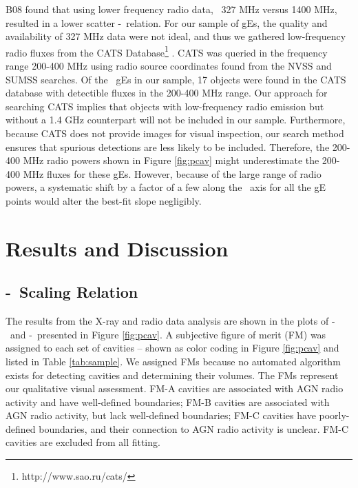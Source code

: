 \documentclass{emulateapj}
\begin{document}
B08 found that using lower frequency radio data, \ie\ 327 MHz versus
1400 MHz, resulted in a lower scatter \pcav-\prad\ relation. For our
sample of gEs, the quality and availability of 327 MHz data were not
ideal, and thus we gathered low-frequency radio fluxes from the CATS
Database\footnote{http://www.sao.ru/cats/} \citep{cats}. CATS was
queried in the frequency range 200-400 MHz using radio source
coordinates found from the NVSS and SUMSS searches. Of the
\samp\ gEs in our sample, 17 objects were found in the CATS database
with detectible fluxes in the 200-400 MHz range. 
Our approach for searching
CATS implies that objects with  low-frequency radio emission but without a 1.4 GHz
counterpart will not be included in our sample. 
Furthermore, because CATS does not provide images
for visual inspection, our search method ensures that spurious
detections are less likely to be included. Therefore, the 200-400 MHz
radio powers shown in Figure \ref{fig:pcav} might underestimate the
200-400 MHz fluxes for these gEs. However, because of the large range
of radio powers, a systematic shift by a factor of a few along the
\prad\ axis for all the gE points would alter the best-fit slope
negligibly.

\section{Results and Discussion}
\label{sec:r&d}

\subsection{\pjet-\prad\ Scaling Relation}
\label{sec:relation}

The results from the X-ray and radio data analysis are shown in the
plots of \pcav-\phigh\ and \pcav-\plow\ presented in Figure
\ref{fig:pcav}. A subjective figure of merit (FM) was assigned to
each set of cavities -- shown as color coding in Figure \ref{fig:pcav}
and listed in Table \ref{tab:sample}. We assigned FMs because
no automated algorithm exists for detecting cavities and
determining their volumes. The FMs represent our qualitative
visual assessment. FM-A cavities are associated with AGN radio
activity and have well-defined boundaries; FM-B cavities are
associated with AGN radio activity, but lack well-defined boundaries;
FM-C cavities have poorly-defined boundaries, and their connection to
AGN radio activity is unclear. FM-C cavities are excluded from all
fitting.
\end{document}
